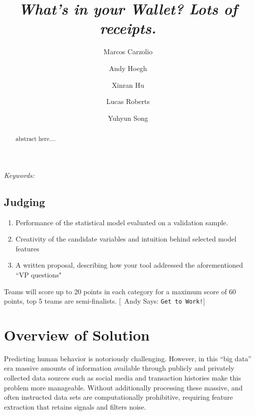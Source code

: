 \documentclass[12pt]{article} %
\begin{document}
\def\spacingset#1{\renewcommand{\baselinestretch}%
{#1}\small\normalsize} \spacingset{1}




  \title{\bf \emph{What's in your Wallet? Lots of receipts.}}
  \author[1]{Marcos Carzolio}
  \author[1]{Andy Hoegh}
  \author[1]{Xinran Hu}
  \author[1]{Lucas Roberts}
  \author[1]{Yuhyun Song}
 \maketitle

\bigskip
\begin{abstract}
\noindent
abstract here....
\end{abstract}

\noindent%
{\it Keywords:} 
\vfill

\newpage


\newcommand{\ac}[1]{[{\color{red}\ Andy Says: {\tt #1}}]}
\newcommand{\xc}[1]{[{\color{red}\ Xinran Says: {\tt #1}}]}
\newcommand{\lc}[1]{[{\color{red}\ Lucas Says: {\tt #1}}]}
\newcommand{\mc}[1]{[{\color{red}\ Marcos Says: {\tt #1}}]}
\newcommand{\yc}[1]{[{\color{red}\ Yuhyun Says: {\tt #1}}]}

\subsection{Judging}
\begin{enumerate}
\item Performance of the statistical model evaluated on a validation sample.
\item Creativity of the candidate variables and intuition behind selected model features
\item A written proposal, describing how your tool addressed the aforementioned ``VP questions"
\end {enumerate}
Teams will score up to 20 points in each category for a maximum score of 60 points, top 5 teams are semi-finalists.
\ac{Get to Work!}
\section{Overview of Solution} 
Predicting human behavior is notoriously challenging.  However, in this ``big data'' era massive amounts of information available through publicly and privately collected data sources such as social media and transaction histories make this problem more manageable.  Without additionally processing these massive, and often instructed data sets are computationally prohibitive, requiring feature extraction that retains signals and filters noise.  
\end{document}
